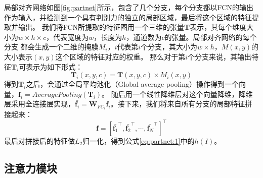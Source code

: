 局部对齐网络如图\ref{fig:partnet}所示，包含了几个分支，每个分支都以FCN的输出作为输入，并检测到一个具有判别力的独立的局部区域，最后将这个区域的特征提取并输出。
我们将FCN所提取的特征图用一个三维的张量\textbf{T}表示，其每个维度大小为$w\times h \times c$，代表宽度为$w$，长度为$h$，通道数为$c$的张量。局部对齐网络的每个分支
都会生成一个二维的掩膜$M_{i}$，$i$代表第$i$个分支，其大小为$w\times h$，$M(x,y)$的大小表示$(x,y)$这个区域的特征对应的权重。
那么对于第$i$个分支来说，其输出特征$\textbf{T}_{i}$可表示为如下形式：
\begin{equation}
\label{eq:partnet:3}
\textbf{T}_{i}(x,y,c)=\textbf{T}(x,y,c) \times M_{i}(x,y)
\end{equation}
得到$\textbf{T}_{i}$之后，会通过全局平均池化（Global average pooling）操作得到一个向量，$\textbf{f}_{i}=AveragePooling(\textbf{T}_{i})$。
随后用一个线性降维层对这个向量降维，降维层采用全连接层实现，$\bar{\textbf{f}_{i}}=\textbf{W}_{FC_{i}}\textbf{f}_{i}$。接下来，我们将来自所有分支的局部特征拼接起来：
\begin{equation}
\label{eq:partnet:4}
\textbf{f}=[\bar{\textbf{f}_{1}}^\top,\bar{\textbf{f}_{2}}^\top,\cdots,\bar{\textbf{f}_{N}}^\top]^\top
\end{equation}
最后对拼接后的特征做$L_{2}$归一化，得到公式\ref{eq:partnet:1}中的$h(I)$。

\subsection{注意力模块}

